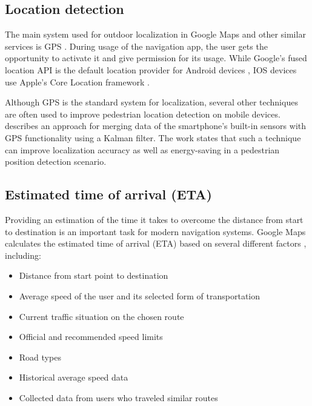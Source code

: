 
\subsection{Location detection}
The main system used for outdoor localization in Google Maps and other similar services is GPS \cite{google_maps}. During usage of the navigation app, the user gets the opportunity to activate it and give permission for its usage. While Google's fused location API is the default location provider for Android devices \cite{fused_location_api}, IOS devices use Apple's Core Location framework \cite{core_location_framework}.

Although GPS is the standard system for localization, several other techniques are often used to improve pedestrian location detection on mobile devices. \cite{localization_techniques} describes an approach for merging data of the smartphone's built-in sensors with GPS functionality using a Kalman filter. The work states that such a technique can improve localization accuracy as well as energy-saving in a pedestrian position detection scenario.

\subsection{Estimated time of arrival (ETA)}
Providing an estimation of the time it takes to overcome the distance from start to destination is an important task for modern navigation systems. Google Maps calculates the estimated time of arrival (ETA) based on several different factors \cite{google_maps}, including:

\begin{itemize}
    \item Distance from start point to destination
    \item Average speed of the user and its selected form of transportation
    \item Current traffic situation on the chosen route
    \item Official and recommended speed limits
    \item Road types
    \item Historical average speed data
    \item Collected data from users who traveled similar routes
\end{itemize}

